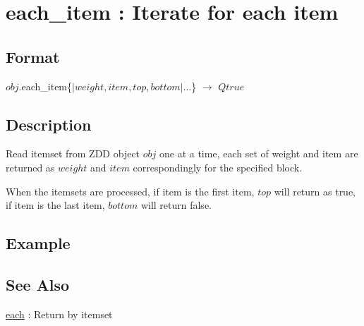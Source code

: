 
\section{each\_item : Iterate for each item\label{sect:each_item}}
\subsection*{Format}
$obj$.each\_item\{$|weight,item,top,bottom|\dots$\} $\rightarrow$ $Qtrue$

\subsection*{Description}
Read itemset from ZDD object $obj$ one at a time, each set of weight and item are returned as $weight$ and $item$ correspondingly for the specified block. 

When the itemsets are processed, if item is the first item, $top$ will return as true, if item is the last item, $bottom$ will return false.  


\subsection*{Example}


\subsection*{See Also}
\hyperref[sect:each]{each} : Return by itemset
